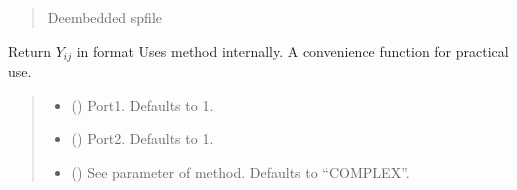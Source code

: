 \documentclass[letterpaper,10pt,english]{sphinxmanual}
\begin{document}
\begin{fulllineitems}
\begin{fulllineitems}
\begin{quote}
\begin{description}
\begin{itemize}
\end{itemize}

\sphinxAtStartPar
De\sphinxhyphen{}embedded spfile

\sphinxAtStartPar
{\hyperref[\detokenize{touchstone:touchstone.spfile}]{}}

\end{description}\end{quote}

\end{fulllineitems}


\begin{fulllineitems}
\label{\detokenize{touchstone:touchstone.spfile.Y}}
\pysigstartsignatures
{}
\pysigstopsignatures
\sphinxAtStartPar
Return \(Y_{i j}\) in format 
Uses  method internally. A convenience function for practical use.
\begin{quote}\begin{description}
\begin{itemize}
\item {}
\sphinxAtStartPar
{} (\sphinxstyleliteralemphasis{\sphinxupquote{, }}) \textendash{} Port\sphinxhyphen{}1. Defaults to 1.

\item {}
\sphinxAtStartPar
{} (\sphinxstyleliteralemphasis{\sphinxupquote{, }}) \textendash{} Port\sphinxhyphen{}2. Defaults to 1.

\item {}
\sphinxAtStartPar
{} (\sphinxstyleliteralemphasis{\sphinxupquote{, }}) \textendash{} See  parameter of  method. Defaults to “COMPLEX”.


\end{itemize}
\end{description}
\end{quote}
\end{fulllineitems}
\end{fulllineitems}
\end{document}
